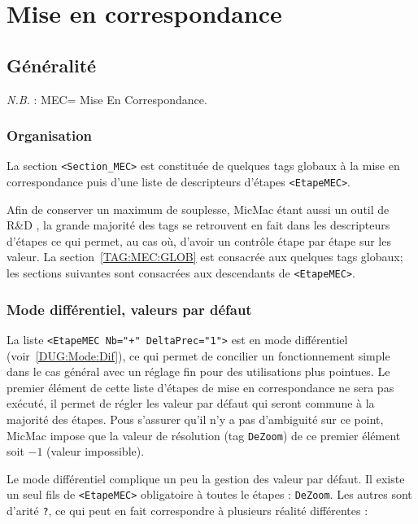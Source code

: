 
\chapter{Mise en correspondance}



\section{G\'en\'eralit\'e}

\emph{N.B.} : MEC= Mise En Correspondance.

\subsection{Organisation}

\label{ORG:MEC}

La section {\tt <Section\_MEC>} est constitu\'ee de quelques
tags globaux \`a la mise en correspondance puis d'une liste
de descripteurs d'\'etapes {\tt <EtapeMEC>}.

Afin de conserver un maximum de souplesse,
MicMac \'etant aussi un outil de R\&D , la grande
majorit\'e des tags se  retrouvent en fait dans
les descripteurs d'\'etapes ce qui permet, au cas o\`u,
d'avoir un contr\^ole \'etape par \'etape sur les valeur.
La section~\ref{TAG:MEC:GLOB} est consacr\'ee aux quelques
tags globaux; les sections suivantes sont consacr\'ees  aux
descendants de {\tt <EtapeMEC>}.

\subsection{Mode diff\'erentiel, valeurs par d\'efaut}

La liste {\tt <EtapeMEC  Nb="+" DeltaPrec="1">} est en mode
diff\'erentiel (voir~\ref{DUG:Mode:Dif}), ce qui permet
de concilier un fonctionnement simple dans le cas g\'en\'eral
avec un r\'eglage fin pour des utilisations plus pointues.
Le premier \'el\'ement de cette liste d'\'etapes de mise
en correspondance ne sera pas ex\'ecut\'e, il permet de
r\'egler les valeur par d\'efaut qui seront commune \`a
la majorit\'e des \'etapes.  Pous s'assurer qu'il n'y a
pas d'ambiguit\'e sur ce point, MicMac impose que la valeur
de r\'esolution (tag {\tt DeZoom})  de ce premier \'el\'ement
soit $-1$ (valeur impossible).

Le mode diff\'erentiel complique un peu la gestion des valeur
par d\'efaut. Il existe un seul fils de {\tt <EtapeMEC>} obligatoire
\`a toutes le \'etapes : {\tt DeZoom}. Les autres sont d'arit\'e {\tt ?},
ce qui peut en fait correspondre \`a plusieurs r\'ealit\'e diff\'erentes :

